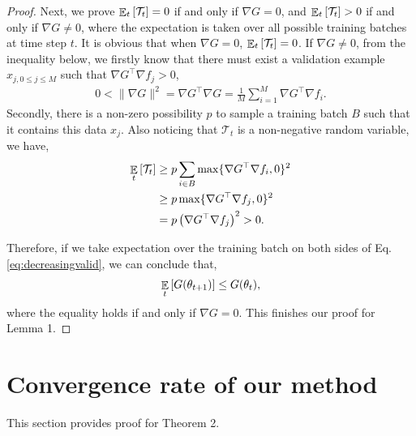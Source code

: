 \begin{proof}
Next, we prove $\EEsub{\mathcal{T}_t}{t}= 0$ if and only if $\nabla G = 0$, and
$\EEsub{\mathcal{T}_t}{t} > 0$ if and only if $\nabla G \neq 0$, where the expectation is taken over
all possible training batches at time step $t$. %
It is obvious that when $\nabla G = 0$, $\EEsub{\mathcal{T}_t}{t} = 0$. If $\nabla G \neq
0$, from the inequality below, we firstly know that there must exist a validation example $x_{j, 0 \leq j \leq M}$ such
that $\nabla G^\top \nabla f_j > 0$,
\begin{align}
\label{eq:positivedotprodexist}
0 < \lVert \nabla G \rVert^2 = \nabla G^\top \nabla G = \frac{1}{M} \sum_{i=1}^M \nabla G^\top \nabla f_i.
\end{align}
Secondly, there is a non-zero possibility $p$ to sample a training batch $B$ such that it contains this data $x_j$.
Also noticing that $\mathcal{T}_t$ is a non-negative random variable, we have,
\begin{align}
\label{eq:EETlargerzero}
\EEsub{\mathcal{T}_t}{t} &\geq p \sum_{i \in B} \max\{\nabla G^\top \nabla f_i, 0\}^2\\
&\geq p \max\{\nabla G^\top \nabla f_j, 0\}^2 \\
&= p \left( \nabla G^\top \nabla f_j \right)^2 > 0.
\end{align}

Therefore, if we take expectation over the training batch on both sides of Eq. \ref{eq:decreasingvalid},
we can conclude that,
\begin{align}
\EEsub{G(\theta_{t+1})}{t} \leq G(\theta_{t}),
\end{align}
where the equality holds if and only if $\nabla G = 0$. This finishes our proof for Lemma 1.
\end{proof}

\section{Convergence rate of our method}
\label{sec:thmproof}
This section provides proof for Theorem 2.

\begin{thm*}

\end{thm*}

